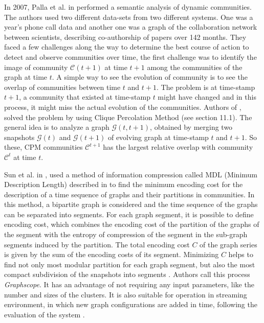 In 2007, Palla et al. in \cite{ref-23} performed a semantic analysis of dynamic communities. The authors used two different data-sets from two different systems. One was a year's phone call data and another one was a graph of the collaboration network between scientists, describing co-authorship of papers over 142 months. They faced a few challenges along the way to determine the best course of action to detect and observe communities over time, the first challenge was to identify the image of community $\mathcal{C}(t+1)$ at time $t+1$ among the communities of the graph at time $t$. A simple way to see the evolution of community is to see the overlap of communities between time $t$ and $t+1$. The problem is at time-stamp $t+1$, a community that existed at time-stamp $t$ might have changed and in this process, it might miss the actual evolution of the communities. Authors of \cite{ref-23}, solved the problem by using Clique Percolation Method (see \cite{ref-6} section 11.1). The general idea is to analyze a graph $\mathcal{G}(t, t+1)$, obtained by merging two snapshots $\mathcal{G}(t)$ and $\mathcal{G}(t+1)$ of evolving graph at time-stamp $t$ and $t+1$. So these, CPM communities {$\mathcal{C}^{t+1}$} has the largest relative overlap with community {$\mathcal{C}^t$} at time $t$.

Sun et al. in \cite{ref-53}, used a method of information compression called MDL (Minimum Description Length) described in \cite{ref-54} to find the minimum encoding cost for the description of a time sequence of graphs and their partitions in communities. In this method, a bipartite graph is considered and the time sequence of the graphs can be separated into segments. For each graph segment, it is possible to define encoding cost, which combines the encoding cost of the partition of the graphs of the segment with the entropy of compression of the segment in the sub-graph segments induced by the partition. The total encoding cost $C$ of the graph series is given by the sum of the encoding costs of its segment. Minimizing $C$ helps to find not only most modular partition for each graph segment, but also the most compact subdivision of the snapshots into segments \cite{ref-54}. Authors call this process \textit{Graphscope}. It has an advantage of not requiring any input parameters, like the number and sizes of the clusters. It is also suitable for operation in streaming environment, in which new graph configurations are added in time, following the evaluation of the system \cite{ref-53}.

